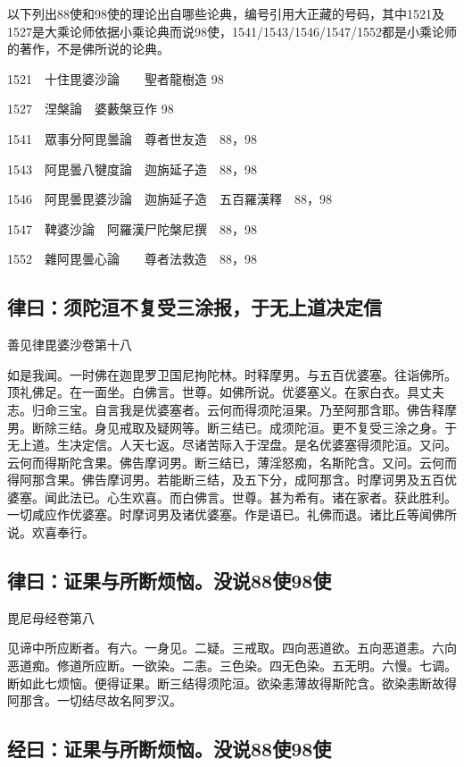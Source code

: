 \documentclass{book}
\begin{document}
以下列出88使和98使的理论出自哪些论典，编号引用大正藏的号码，其中1521及1527是大乘论师依据小乘论典而说98使，1541/1543/1546/1547/1552都是小乘论师的著作，不是佛所说的论典。

1521　十住毘婆沙論　　聖者龍樹造 98

1527　涅槃論　婆藪槃豆作 98

1541　眾事分阿毘曇論　尊者世友造　88，98

1543　阿毘曇八犍度論　迦旃延子造　88，98

1546　阿毘曇毘婆沙論　迦旃延子造　五百羅漢釋　88，98

1547　鞞婆沙論　阿羅漢尸陀槃尼撰　88，98

1552　雜阿毘曇心論　　尊者法救造　88，98

\subsection{律曰：须陀洹不复受三涂报，于无上道决定信}

善见律毘婆沙卷第十八

如是我闻。一时佛在迦毘罗卫国尼拘陀林。时释摩男。与五百优婆塞。往诣佛所。顶礼佛足。在一面坐。白佛言。世尊。如佛所说。优婆塞义。在家白衣。具丈夫志。归命三宝。自言我是优婆塞者。云何而得须陀洹果。乃至阿那含耶。佛告释摩男。断除三结。身见戒取及疑网等。断三结已。成须陀洹。更不复受三涂之身。于无上道。生决定信。人天七返。尽诸苦际入于涅盘。是名优婆塞得须陀洹。又问。云何而得斯陀含果。佛告摩诃男。断三结已，薄淫怒痴，名斯陀含。又问。云何而得阿那含果。佛告摩诃男。若能断三结，及五下分，成阿那含。时摩诃男及五百优婆塞。闻此法已。心生欢喜。而白佛言。世尊。甚为希有。诸在家者。获此胜利。一切咸应作优婆塞。时摩诃男及诸优婆塞。作是语已。礼佛而退。诸比丘等闻佛所说。欢喜奉行。

\subsection{律曰：证果与所断烦恼。没说88使98使}

毘尼母经卷第八

见谛中所应断者。有六。一身见。二疑。三戒取。四向恶道欲。五向恶道恚。六向恶道痴。修道所应断。一欲染。二恚。三色染。四无色染。五无明。六慢。七调。断如此七烦恼。便得证果。断三结得须陀洹。欲染恚薄故得斯陀含。欲染恚断故得阿那含。一切结尽故名阿罗汉。

\subsection{经曰：证果与所断烦恼。没说88使98使}
\end{document}
